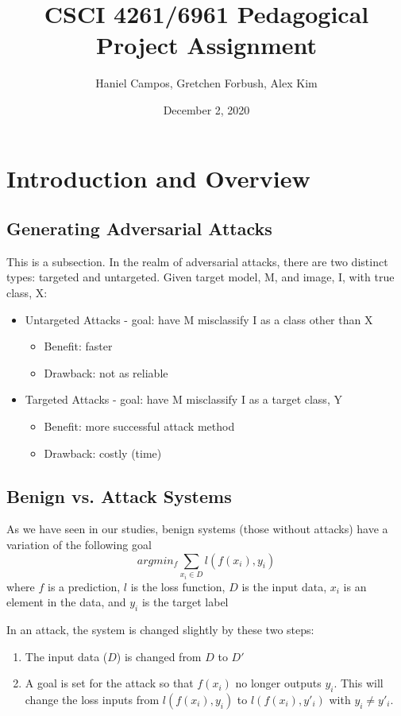 \documentclass{article}
\title{CSCI 4261/6961 Pedagogical Project Assignment}
\author{Haniel Campos, Gretchen Forbush, Alex Kim}
\date{December 2, 2020}
\begin{document}
\maketitle

\section{Introduction and Overview}

\subsection{Generating Adversarial Attacks}
This is a subsection.
In the realm of adversarial attacks, there are two distinct types: targeted and untargeted. Given target model, M, and image, I, with true class, X:
\begin{itemize}
    \item Untargeted Attacks - goal: have M misclassify I as a class other than X
    \begin{itemize}
        \item Benefit: faster
        \item Drawback: not as reliable
    \end{itemize}
    \item Targeted Attacks - goal: have M misclassify I as a target class, Y
    \begin{itemize}
        \item Benefit: more successful attack method
        \item Drawback: costly (time)
    \end{itemize}
\end{itemize}

\subsection{Benign vs. Attack Systems}
As we have seen in our studies, benign systems (those without attacks) have a variation of the following goal
$$argmin_f \sum_{x_i\in D} l(f(x_i),y_i)$$
where $f$ is a prediction, $l$ is the loss function, $D$ is the input data, $x_i$ is an element in the data, and $y_i$ is the target label

In an attack, the system is changed slightly by these two steps:
\begin{enumerate}
    \item The input data ($D$) is changed from $D$ to $D'$
    \item  A goal is set for the attack so that $f(x_i)$ no longer outputs $y_i$. This will change the loss inputs from $l(f(x_i),y_i)$ to $l(f(x_i),y'_i)$ with $y_i \neq y'_i$.
\end{enumerate}
\end{document}
